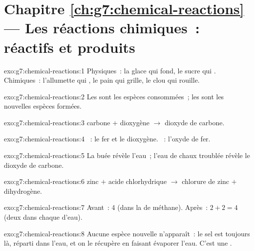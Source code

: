 \section*{Chapitre \ref{ch:g7:chemical-reactions} --- Les réactions chimiques~: réactifs et produits}

\begin{solution}{exo:g7:chemical-reactions:1}
Physiques~: la glace qui fond, le sucre qui . Chimiques~:
l'allumette qui , le pain qui grille, le clou qui rouille.
\end{solution}

\begin{solution}{exo:g7:chemical-reactions:2}
Les  sont les espèces consommées~; les  sont les
nouvelles espèces formées.
\end{solution}

\begin{solution}{exo:g7:chemical-reactions:3}
carbone $+$ dioxygène $\longrightarrow$ dioxyde de carbone.
\end{solution}

\begin{solution}{exo:g7:chemical-reactions:4}
~: le fer et le dioxygène. ~: l'oxyde de fer.
\end{solution}

\begin{solution}{exo:g7:chemical-reactions:5}
La buée révèle l'eau~; l'eau de chaux troublée révèle le dioxyde de
carbone.
\end{solution}

\begin{solution}{exo:g7:chemical-reactions:6}
zinc $+$ acide chlorhydrique $\longrightarrow$ chlorure de zinc $+$
dihydrogène.
\end{solution}

\begin{solution}{exo:g7:chemical-reactions:7}
Avant~: 4 (dans la  de méthane). Après~: $2 + 2 = 4$ (deux dans
chaque  d'eau).
\end{solution}

\begin{solution}{exo:g7:chemical-reactions:8}
Aucune espèce nouvelle n'apparaît~: le sel est toujours là, réparti dans
l'eau, et on le récupère en faisant évaporer l'eau. C'est une
.
\end{solution}

